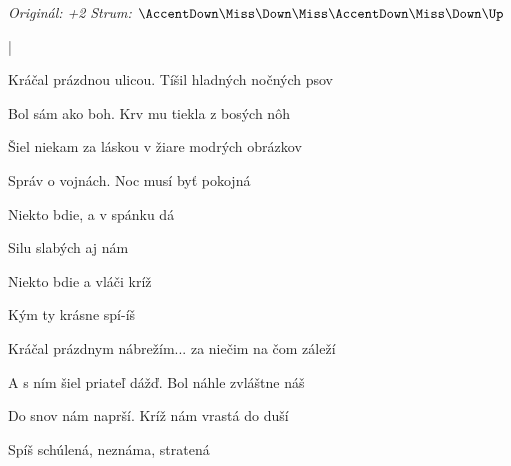 \begin{song}


\begin{headerbox}
\RaiseBoxWithAccents
\textit{Originál: +2} \quad
\textit{Strum:} $\AccentDown\Miss\Down\Miss\AccentDown\Miss\Down\Up$
\end{headerbox}

\begin{hchordbox}
\end{hchordbox}

\Large

\bigskip

\Intro {}    |     \par

\bigskip

Kráčal prázdnou ulicou. Tíšil hladných nočných psov \par
Bol sám  ako boh. Krv mu tiekla z bosých nôh \par

\bigskip

 Šiel niekam za láskou v žiare modrých obrázkov \par
{}Správ  o vojnách. Noc musí byť pokojná \par

\bigskip

Niekto bdie, a v spánku dá \par
{} Silu slabých aj nám \par
{} Niekto bdie a vláči kríž \par
{} Kým ty krásne spí-íš  \par

\bigskip

Kráčal prázdnym nábrežím... za niečim na čom záleží \par
A s ním šiel priateľ dážď. Bol náhle zvláštne náš \par

\bigskip

 Do snov nám naprší. Kríž nám vrastá  do duší \par
{}Spíš schúlená, neznáma, stratená \par


\end{song}
